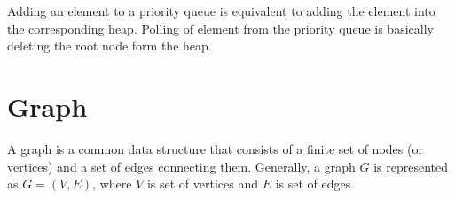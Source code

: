 \documentclass[a4paper,11pt]{book}
\begin{document}
\noindent Adding an element to a priority queue is equivalent to adding the element into the corresponding heap. Polling of element from the priority queue is basically deleting the root node form the heap.

%
%
%
%	
%	
%	
%		

\section{Graph}

\noindent A graph is a common data structure that consists of a finite set of nodes (or vertices) and a set of edges connecting them. Generally, a graph $G$ is represented as $G = (V, E)$, where $V$ is set of vertices and $E$ is set of edges.
\end{document}
